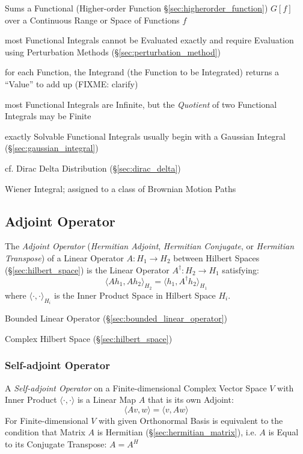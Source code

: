 Sums a Functional (Higher-order Function \S\ref{sec:higherorder_function})
$G[f]$ over a Continuous Range or Space of Functions $f$

most Functional Integrals cannot be Evaluated exactly and require Evaluation
using Perturbation Methods (\S\ref{sec:perturbation_method})

for each Function, the Integrand (the Function to be Integrated) returns a
``Value'' to add up (FIXME: clarify)

most Functional Integrals are Infinite, but the \emph{Quotient} of two
Functional Integrals may be Finite

exactly Solvable Functional Integrals usually begin with a Gaussian Integral
(\S\ref{sec:gaussian_integral})

cf. Dirac Delta Distribution (\S\ref{sec:dirac_delta})

Wiener Integral; assigned to a class of Brownian Motion Paths



\subsection{Adjoint Operator}\label{sec:adjoint_operator}

The \emph{Adjoint Operator} (\emph{Hermitian Adjoint}, \emph{Hermitian
  Conjugate}, or \emph{Hermitian Transpose}) of a Linear Operator $A : H_1
\rightarrow H_2$ between Hilbert Spaces (\S\ref{sec:hilbert_space}) is the
Linear Operator $A^\dag : H_2 \rightarrow H_1$ satisfying:
\[
  \langle{Ah_1,Ah_2}\rangle_{H_2} = \langle{h_1,A^{\dag}h_2}\rangle_{H_1}
\]
where $\langle\cdot,\cdot\rangle_{H_i}$ is the Inner Product Space in Hilbert
Space $H_i$.


Bounded Linear Operator (\S\ref{sec:bounded_linear_operator})

Complex Hilbert Space (\S\ref{sec:hilbert_space})



\subsubsection{Self-adjoint Operator}\label{sec:self_adjoint_operator}

A \emph{Self-adjoint Operator} on a Finite-dimensional Complex Vector Space $V$
with Inner Product $\langle{\cdot, \cdot}\rangle$ is a Linear Map $A$ that is
its own Adjoint:
\[
  \langle{Av,w}\rangle = \langle{v,Aw}\rangle
\]
For Finite-dimensional $V$ with given Orthonormal Basis is equivalent to the
condition that Matrix $A$ is Hermitian (\S\ref{sec:hermitian_matrix}), i.e. $A$
is Equal to its Conjugate Transpose: $A = A^H$

